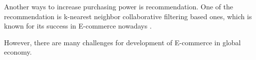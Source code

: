 \documentclass[conference]{IEEEtran}
\begin{document}



 

 Another ways to increase purchasing power is recommendation. One of the recommendation is k-nearest neighbor
 collaborative filtering based ones, which is known for its 
 success in E-commerce nowadays \cite{sarwar2002recommender} .

However, there are many challenges for development of E-commerce in global economy\cite{ecimpactspolicy}.



\end{document}
